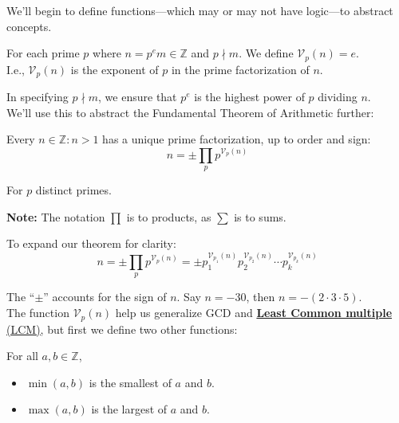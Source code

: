 \newpage
\noindent
We'll begin to define functions---which may or may not have logic---to abstract concepts.
\begin{Def}

    For each prime $p$ where $n=p^em \in\mathbb{Z}$ and $p\nmid m$. We define $\mathcal{V}_p(n)=e$.\\
    I.e., $\mathcal{V}_p(n)$ is the exponent of $p$ in the prime factorization of $n$. 
\end{Def}
In specifying $p\nmid m$, we ensure that $p^e$ is the highest power of $p$ dividing $n$.\\

\noindent
We'll use this to abstract the Fundamental Theorem of Arithmetic further:
\begin{theo}

    \label{theo:FTA_abstracted}

    Every $n\in\mathbb{Z}:n>1$ has a unique prime factorization, up to order and sign:
    \LARGE \[n = \pm \prod_{p} p^{\mathcal{V}_p(n)}\]
    
    \normalsize
    \noindent
    For $p$ distinct primes.
\end{theo}
\begin{Note}
    \textbf{Note:} The notation $\prod$ is to products, as $\sum$ is to sums.
\end{Note}

\noindent
To expand our theorem for clarity:
\LARGE
\[
    n = \pm \prod_{p} p^{\mathcal{V}_p(n)} = \pm p_1^{\mathcal{V}_{p_1}(n)} p_2^{\mathcal{V}_{p_2}(n)} \cdots p_k^{\mathcal{V}_{p_k}(n)}
\]
\normalsize

\noindent
The ``$\pm$'' accounts for the sign of $n$. Say $n=-30$, then $n=-(2\cdot3\cdot5)$.\\

\noindent
The function $\mathcal{V}_p(n)$ help us generalize GCD and \underline{\textbf{Least Common multiple} (LCM),} but first we define two other functions:

\begin{Def}
    
        For all $a,b\in\mathbb{Z}$,
        \begin{itemize}
            \item $\min(a,b)$ is the smallest of $a$ and $b$.
            \item $\max(a,b)$ is the largest of $a$ and $b$.
        \end{itemize}
\end{Def}

